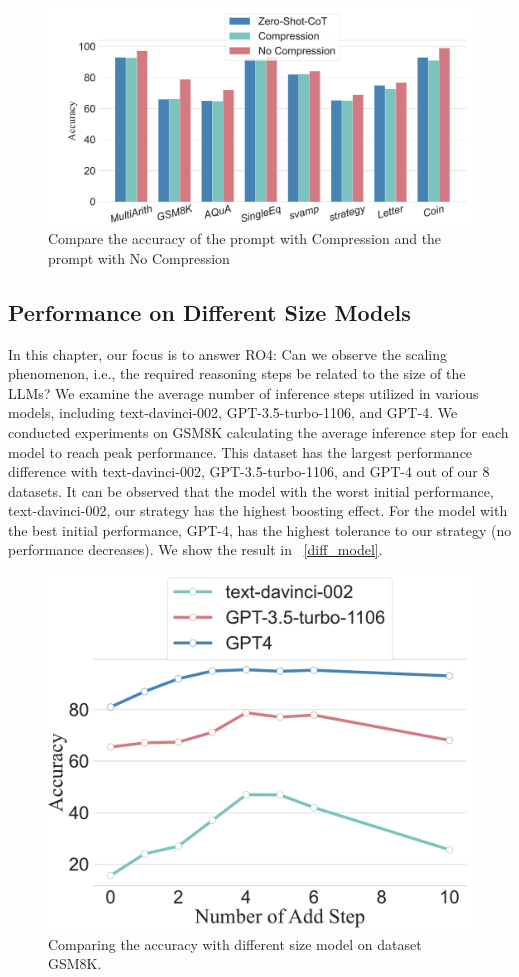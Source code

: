 \documentclass[11pt]{article}
\begin{document}
\begin{figure}[t]
    \centering
    \includegraphics[width=1\linewidth]{Compression.pdf}
   \caption{Compare the accuracy of the prompt with Compression and the prompt with No Compression}
    \label{fig:Compression}
\end{figure}




\subsection{Performance on Different Size Models}
\label{section4.5}

In this chapter, our focus is to answer RO4: Can we observe the scaling phenomenon, i.e., the required reasoning steps be related to the size of the LLMs? We examine the average number of inference steps utilized in various models, including text-davinci-002, GPT-3.5-turbo-1106, and GPT-4. We conducted experiments on GSM8K calculating the average inference step for each model to reach peak performance. This dataset has the largest performance difference with text-davinci-002, GPT-3.5-turbo-1106, and GPT-4 out of our 8 datasets. It can be observed that the model with the worst initial performance, text-davinci-002, our strategy has the highest boosting effect. For the model with the best initial performance, GPT-4, has the highest tolerance to our strategy (no performance decreases). We show the result in ~\autoref{diff_model}.

\begin{figure}[t]
    \centering
    \includegraphics[width=0.75\linewidth]{DIFF_MODEL.pdf}
    \caption{Comparing the accuracy with different size model on dataset GSM8K.}
    \label{diff_model}
\end{figure}
\end{document}
